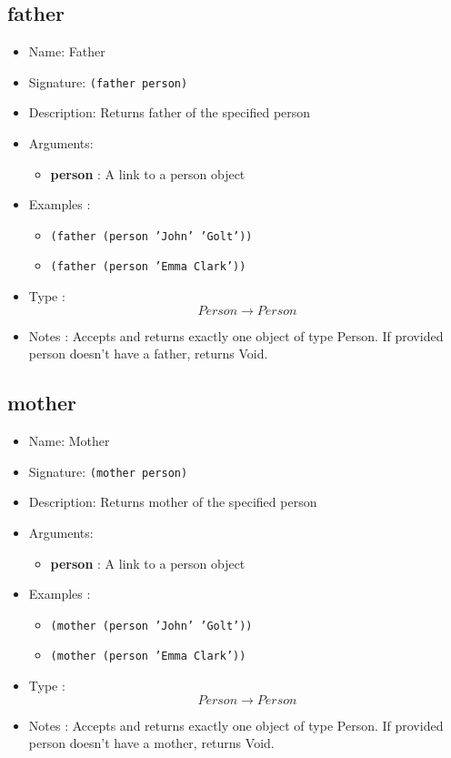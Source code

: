 \subsection{father}
\begin{itemize}
    \item Name: Father
    \item Signature: \texttt{(father person)}
    \item Description: Returns father of the specified person
    \item Arguments:
        \begin{itemize}
            \item \textbf{person} : A link to a person object
        \end{itemize}
    \item Examples :
        \begin{itemize}
            \item \texttt{(father (person 'John' 'Golt'))}
            \item \texttt{(father (person 'Emma Clark'))}
        \end{itemize}
    \item Type : \[Person \to Person\]
    \item Notes : Accepts and returns exactly one object of type Person. If provided person doesn't have a father, returns Void.
\end{itemize}

\subsection{mother}
\begin{itemize}
    \item Name: Mother
    \item Signature: \texttt{(mother person)}
    \item Description: Returns mother of the specified person
    \item Arguments:
        \begin{itemize}
            \item \textbf{person} : A link to a person object
        \end{itemize}
    \item Examples :
        \begin{itemize}
            \item \texttt{(mother (person 'John' 'Golt'))}
            \item \texttt{(mother (person 'Emma Clark'))}
        \end{itemize}
    \item Type : \[Person \to Person\]
    \item Notes : Accepts and returns exactly one object of type Person. If provided person doesn't have a mother, returns Void.
\end{itemize}

